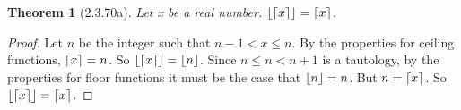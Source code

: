\documentclass[a4paper, 12pt]{article}
\theoremstyle{plain}
\newtheorem*{theorem*}{Theorem}
\DeclarePairedDelimiter{\floor}{\lfloor}{\rfloor}
\DeclarePairedDelimiter{\ceil}{\lceil}{\rceil}
\begin{document}
	
	\begin{theorem*}[2.3.70a]
		Let x be a real number. $\floor{\ceil{x}} = \ceil{x}$.
	\end{theorem*}
	
	\begin{proof}
		Let $n$ be the integer such that $n - 1 < x \le n$. By the properties for ceiling functions, $\ceil{x} = n$. So $\floor{\ceil{x}} = \floor{n}$. Since $n \le n < n + 1$ is a tautology, by the properties for floor functions it must be the case that $\floor{n} = n$. But $n = \ceil{x}$. So $\floor{\ceil{x}} = \ceil{x}$.
	\end{proof}
\end{document}
